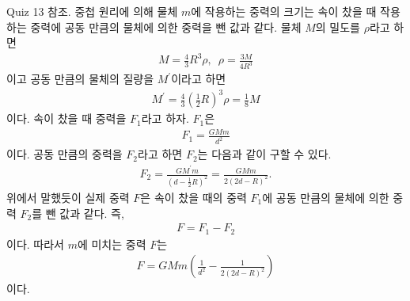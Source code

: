 \documentclass[floatfix,nofootinbib,superscriptaddress,fleqn]{revtex4-2}
\begin{document}
\vspace{0.5cm} 
Quiz 13 참조.
중첩 원리에 의해 물체 $m$에 작용하는 중력의 크기는 속이 찼을 때 
작용하는 중력에 공동 만큼의 물체에 의한 중력을 뺀 값과 같다.
물체 $M$의 밀도를 $\rho$라고 하면
\begin{align}
    M = \frac{4}{3}R^3\rho ,\,\,\,\rho = \frac{3M}{4R^3}
\end{align}
이고 공동 만큼의 물체의 질량을 $M^\prime$이라고 하면
\begin{align}
    M^\prime = \frac{4}{3}{\left(\frac{1}{2}R\right)}^3\rho=\frac{1}{8}M
\end{align}
이다. 속이 찼을 때 중력을 $F_1$라고 하자. $F_1$은
\begin{align}
    F_1 = \frac{GMm}{d^2}
\end{align}
이다. 공동 만큼의 중력을 $F_2$라고 하면 $F_2$는 다음과 같이 구할 수 있다.
\begin{align}
    F_2 = \frac{GM^\prime m}{(d-\frac{1}{2}R)^2}=\frac{GMm}
    {2(2d-R)^2}.
\end{align}
위에서 말했듯이 실제 중력 $F$은 속이 찼을 때의 중력 $F_1$에 공동 만큼의 물체에 의한 중력 $F_2$를
뺀 값과 같다.  즉,
\begin{align}
    F= F_1 - F_2
\end{align}
이다. 따라서 $m$에 미치는 중력 $F$는
\begin{align}
    F = GMm\left(\frac{1}{d^2}-\frac{1}{2(2d-R)^2}\right)
\end{align}
이다.
\vspace{0.5cm}
 

\vspace{0.5cm} 
\end{document}
